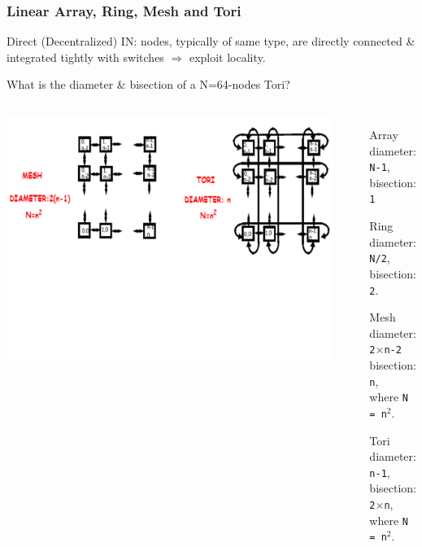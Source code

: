 \documentclass{beamer}
\renewcommand{\emph}[1]{\textcolor{structure}{#1}}
\newcommand{\emp}[1]{\textcolor{DikuRed}{ #1}}
\begin{document}
\begin{frame}[fragile,t]
\frametitle{Linear Array, Ring, Mesh and Tori}

\emp{Direct (Decentralized) IN}: nodes, typically of same type, are directly 
connected \& integrated tightly with switches $\Rightarrow$ \emph{exploit locality}.

\medskip
\alert{What is the diameter \& bisection of a N=64-nodes Tori?}

\begin{columns}
\vspace{-2ex}
\vspace{-11ex}

\includegraphics[width=44ex]{FigsInterconnect/MeshTori}\pause
{}
\vspace{-10ex}
\begin{itemize}
    \item[Array] diameter: {\tt N-1},\\ bisection: {\tt 1}\medskip
    \item[Ring]  diameter: {\tt N/2},\\ bisection: {\tt 2}.\bigskip
    \item[Mesh]  diameter: {\tt 2$\times$n-2}\\ bisection: {\tt n},\\ where {\tt N = n$^2$}.\medskip 
    \item[Tori]  diameter: {\tt n-1},\\ bisection: {\tt 2$\times$n},\\ where {\tt N = n$^2$}.\medskip
\end  {itemize}
\end{columns}

\end{frame}
\end{document}
